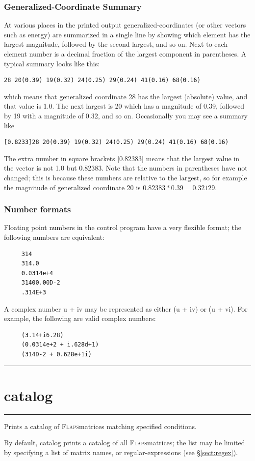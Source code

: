 \documentclass[11pt,openany,twoside]{book}
\makeatletter
\numberwithin{equation}{section}		%
\newcommand{\Cmd}[1]{{\sf #1}}
\newcommand{\Flaps}{\textsc{Flaps\:}}
\newcommand{\Manpg}[1]{
	\hspace{-\parindent}\rule[-5mm]{\textwidth}{0.3mm}
	\newpage
	\section[\Cmd{#1}]{\sf\Large{#1}} \label{ref:#1} \index{#1@\Cmd{#1}!reference}
	\rule[5mm]{\textwidth}{0.3mm}
}
\newcommand{\Sectref}[1]{\S\ref{#1}}
\makeatother
\begin{document}
\subsubsection{Generalized-Coordinate Summary}\label{ref:gcsummary}
At various places in the printed output generalized-coordinates
(or other vectors such as energy) are summarized in a single line by showing which
element has the largest magnitude, followed by the second largest,
and so on. Next to each element number is a decimal fraction of
the largest component in parentheses.
A typical summary looks like this:
\begin{lstlisting}
28 20(0.39) 19(0.32) 24(0.25) 29(0.24) 41(0.16) 68(0.16)
\end{lstlisting}
which means that generalized coordinate 28 has the largest (absolute) value,
and that value is 1.0. The next largest is 20 which has a
magnitude of 0.39, followed by 19 with a magnitude of 0.32, and so on.
Occasionally you may see a summary like
\begin{lstlisting}
[0.8233]28 20(0.39) 19(0.32) 24(0.25) 29(0.24) 41(0.16) 68(0.16)
\end{lstlisting}

The extra number in square brackets [0.82383] means that the largest
value in the vector is not 1.0 but 0.82383. Note that the numbers
in parentheses have not changed; this is because these numbers are
relative to the
largest, so for example the magnitude of generalized coordinate 20
is $ 0.82383*0.39 = 0.32129 $.

\subsubsection{Number formats \label{sect:numformat}}
Floating point numbers in the control program have a very
flexible format; the following numbers are equivalent:
\begin{lstlisting}
     314
     314.0
     0.0314e+4
     31400.00D-2
     .314E+3
\end{lstlisting}
\par
A complex number u + iv may be represented as either
(u + iv) or (u + vi).
For example, the following are valid complex numbers:
\par
\begin{lstlisting}
     (3.14+i6.28)
     (0.0314e+2 + i.628d+1)
     (314D-2 + 0.628e+1i)
\end{lstlisting}

\Manpg{catalog}
Prints a catalog of \Flaps matrices matching specified
conditions.
\par
By default, \Cmd{catalog} prints a catalog
of all \Flaps matrices;
the list may be limited by specifying a list of matrix names,
or regular-expressions (see \Sectref{sect:regex}).
\end{document}
